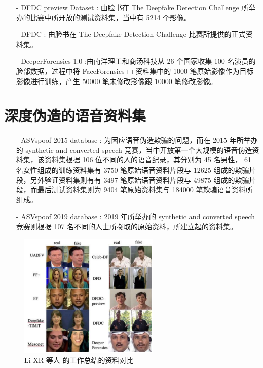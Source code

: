 \begin{itemize}
\item [-] DFDC preview Dataset \cite{dolhansky2019deepfake}: 由脸书在 The Deepfake Detection Challenge 所举办的比赛中所开放的测试资料集，当中有 5214 个影像。

\item [-] DFDC \cite{list1069}: 由脸书在 The Deepfake Detection Challenge 比赛所提供的正式资料集。

\item [-] DeeperForensics-1.0 \cite{jiang2020deeperforensics}:由南洋理工和商汤科技从 26 个国家收集 100 名演员的脸部数据，过程中将 FaceForensics++资料集中的 1000 笔原始影像作为目标影像进行训练，产生 50000 笔未修改影像跟 10000 笔修改影像。
\end{itemize}

\section{深度伪造的语音资料集}

\begin{itemize}
\item [-] ASVspoof 2015 database \cite{list1071}: 为因应语音伪造欺骗的问题，而在 2015 年所举办的 synthetic and converted speech 竞赛，当中开放第一个大规模的语音伪造资料集，该资料集根据 106 位不同的人的语音纪录，其分别为 45 名男性， 61 名女性组成的训练资料集有 3750 笔原始语音资料片段与 12625 组成的欺骗片段，另外验证资料集则有有 3497 笔原始语音资料片段与 49875 组成的欺骗片段，而最后测试资料集则为 9404 笔原始资料集与 184000 笔欺骗语音资料所组成。

\item [-] ASVspoof 2019 database \cite{list1072}: 2019 年所举办的 synthetic and converted speech 竞赛则根据 107 名不同的人士所撷取的原始资料，所建立起的资料集。
\end{itemize}

\begin{figure}[htb]
\centering 
\includegraphics[width=0.60\textwidth]{img/ch2m1.png} 
\caption{Li XR 等人 \cite{2021496} 的工作总结的资料对比}
\label{Test}
\end{figure}
